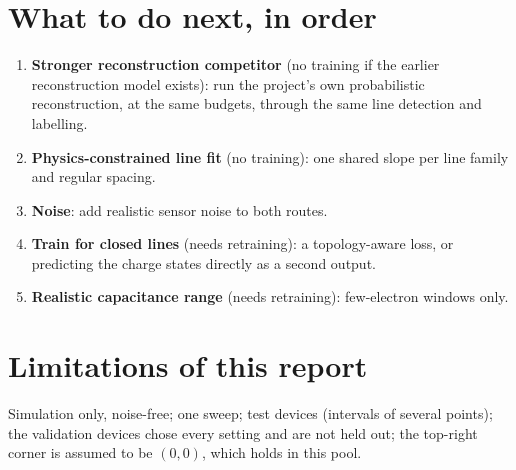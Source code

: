 \documentclass[10pt,a4paper]{article}
\begin{document}
\section{What to do next, in order}
\begin{enumerate}
\item \textbf{Stronger reconstruction competitor} (no training if the
  earlier reconstruction model exists): run the project's own probabilistic
  reconstruction, at the same budgets, through the same line detection and
  labelling.
\item \textbf{Physics-constrained line fit} (no training): one shared slope
  per line family and regular spacing.
\item \textbf{Noise}: add realistic sensor noise to both routes.
\item \textbf{Train for closed lines} (needs retraining): a topology-aware
  loss, or predicting the charge states directly as a second output.
\item \textbf{Realistic capacitance range} (needs retraining): few-electron
  windows only.
\end{enumerate}

\section{Limitations of this report}
Simulation only, noise-free; one sweep; \vNTest{} test devices (intervals of
several points); the validation devices chose every setting and are not
held out; the top-right corner is assumed to be $(0,0)$, which holds in this
pool.
\end{document}
